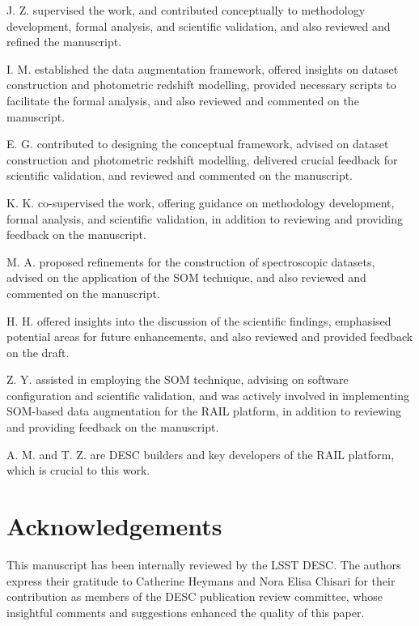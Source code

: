 \documentclass[fleqn, usenatbib]{mnras}
\begin{document}
J. Z. supervised the work, and contributed conceptually to methodology development, formal analysis, and scientific validation, and also reviewed and refined the manuscript.

I. M. established the data augmentation framework, offered insights on dataset construction and photometric redshift modelling, provided necessary scripts to facilitate the formal analysis, and also reviewed and commented on the manuscript.

E. G. contributed to designing the conceptual framework, advised on dataset construction and photometric redshift modelling, delivered crucial feedback for scientific validation, and reviewed and commented on the manuscript.

K. K. co-supervised the work, offering guidance on methodology development, formal analysis, and scientific validation, in addition to reviewing and providing feedback on the manuscript.

M. A. proposed refinements for the construction of spectroscopic datasets, advised on the application of the SOM technique, and also reviewed and commented on the manuscript.

H. H. offered insights into the discussion of the scientific findings, emphasised potential areas for future enhancements, and also reviewed and provided feedback on the draft.

Z. Y. assisted in employing the SOM technique, advising on software configuration and scientific validation, and was actively involved in implementing SOM-based data augmentation for the RAIL platform, in addition to reviewing and providing feedback on the manuscript.

A. M. and T. Z. are DESC builders and key developers of the RAIL platform, which is crucial to this work.



\section*{Acknowledgements}

This manuscript has been internally reviewed by the LSST DESC. The authors express their gratitude to Catherine Heymans and Nora Elisa Chisari for their contribution as members of the DESC publication review committee, whose insightful comments and suggestions enhanced the quality of this paper.
\end{document}
